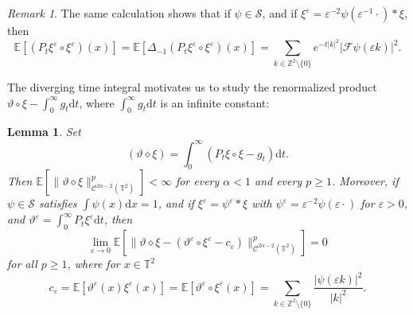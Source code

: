 \documentclass[11pt,a4paper]{article}
\newcommand{\mathd}{\mathrm{d}}
\newtheorem{lemma}[theorem]{Lemma}
\theoremstyle{remark}
\newtheorem{remark}[theorem]{Remark}
\newcommand{\Z}{\mathbb{Z}}
\newcommand{\E}{\mathbb{E}}
\newcommand{\CC}{\ensuremath{\mathscr{C}}}
\newcommand{\CF}{\ensuremath{\mathscr{F}}}
\newcommand{\CS}{\ensuremath{\mathscr{S}}}
\begin{document}
\begin{remark}
   The same calculation shows that if $\psi \in \CS$, and if $\xi^\varepsilon = \varepsilon^{-2} \psi (\varepsilon^{-1} \cdot) \ast \xi$, then
   \[
      \E[ (P_t \xi^\varepsilon \circ \xi^\varepsilon) ( x ) ] = \E[ \Delta_{- 1} (P_t \xi^\varepsilon \circ \xi^\varepsilon ) ( x ) ] = \sum_{k \in\mathbb{Z}^2\setminus \{0\}} e^{- t | k |^2} |\CF \psi (\varepsilon k)|^2.
   \]
\end{remark}

The diverging time integral motivates us to study the renormalized product $\vartheta \circ \xi  - \int_0^\infty g_t \mathd t$, where $\int_0^\infty g_t \mathd t$ is an infinite constant:

\begin{lemma}\label{l:pam area}
   Set
   \[
      (\vartheta \diamond \xi) = \int_0^\infty (P_t \xi \circ \xi - g_t) \mathd t.
   \]
   Then $\E [\| \vartheta \diamond \xi\|_{\CC^{2\alpha - 2}(\mathbb{T}^2)}^p]<\infty$ for every $\alpha < 1$ and every $p \ge 1$. Moreover, if $\psi \in \CS$ satisfies $\int \psi(x) \mathd x = 1$, and if $\xi^\varepsilon = \psi^\varepsilon \ast \xi$ with $\psi^\varepsilon = \varepsilon^{-2} \psi(\varepsilon \cdot)$ for $\varepsilon > 0$, and $\vartheta^\varepsilon = \int_0^\infty P_t \xi^\varepsilon \mathd t$, then
   \[
      \lim_{\varepsilon \rightarrow 0} \E[ \| \vartheta \diamond \xi - ( \vartheta^\varepsilon \circ \xi^\varepsilon - c_\varepsilon) \|_{\CC^{2\alpha - 2}(\mathbb{T}^2)}^p] = 0
   \]
   for all $p \ge 1$, where for $x \in \mathbb{T}^2$
   \[
      c_\varepsilon = \E[\vartheta^\varepsilon(x) \xi^\varepsilon(x)] = \E[\vartheta^\varepsilon \circ \xi^\varepsilon(x)] = \sum_{k \in \Z^2 \setminus\{0\}} \frac{|\psi(\varepsilon k)|^2}{|k|^2}.
   \]
%   
\end{lemma}
\end{document}
